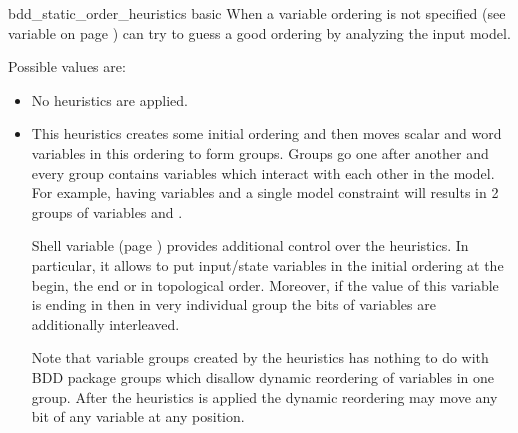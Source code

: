 \begin{nusmvVar} {bdd\_static\_order\_heuristics}
   {}{basic}
\label{bdd_static_order_heuristics}
%
 When a variable ordering is not specified (see variable
  on page \pageref{input_order_file})
 \nusmv can try to guess a good ordering by analyzing the input model.

 Possible values are:
\begin{itemize}
\item {} No heuristics are applied.
\item {} This heuristics creates some initial ordering 
 and then moves scalar and word variables in this ordering to form
 groups. Groups go one after another and every group contains
 variables which interact with each other in the model. For example,
 having variables  and a single model constraint
  will results
 in 2 groups of variables  and .

 Shell variable  (page
 \pageref{vars_order_type}) provides additional control over the
 heuristics. In particular, it allows to put input/state variables in
 the initial ordering at the begin, the end or in topological order.
 Moreover, if the value of this variable is ending in 
 then in very individual group the bits of variables are additionally
 interleaved.

 Note that variable groups created by the heuristics has nothing to do
 with BDD package groups which disallow dynamic reordering of
 variables in one group. After the heuristics is applied the dynamic
 reordering may move any bit of any variable at any position.

\end{itemize}
\end{nusmvVar}


\label{build::model}


